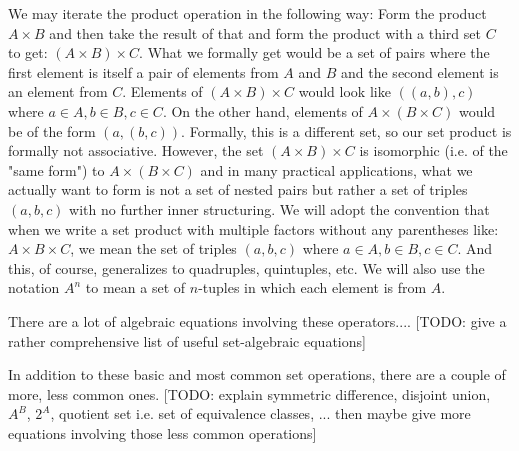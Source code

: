 We may iterate the product operation in the following way: Form the product $A \times B$ and then take the result of that and form the product with a third set $C$ to get: $(A \times B) \times C$. What we formally get would be a set of pairs where the first element is itself a pair of elements from $A$ and $B$ and the second element is an element from $C$. Elements of $(A \times B) \times C$ would look like $((a,b),c)$ where $a \in A, b \in B, c \in C$. On the other hand, elements of $A \times (B \times C)$ would be of the form $(a, (b,c))$. Formally, this is a different set, so our set product is formally not associative. However, the set $(A \times B) \times C$ is isomorphic (i.e. of the "same form") to $A \times (B \times C)$ and in many practical applications, what we actually want to form is not a set of nested pairs but rather a set of triples $(a,b,c)$ with no further inner structuring. We will adopt the convention that when we write a set product with multiple factors without any parentheses like: $A \times B \times C$, we mean the set of triples $(a,b,c)$ where $a \in A, b \in B, c \in C$. And this, of course, generalizes to quadruples, quintuples, etc. We will also use the notation $A^n$ to mean a set of $n$-tuples in which each element is from $A$.



\medskip
There are a lot of algebraic equations involving these operators.... [TODO: give a rather comprehensive list of useful set-algebraic equations]

\medskip
In addition to these basic and most common set operations, there are a couple of more, less common ones. [TODO: explain symmetric difference, disjoint union, $A^B$, $2^A$, quotient set i.e. set of equivalence classes, ... then maybe give more equations involving those less common operations]










